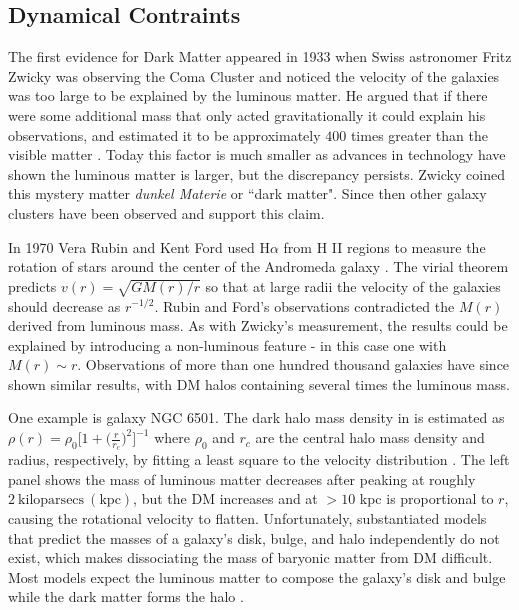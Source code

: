 \subsection{Dynamical Contraints} \label{subsec:dynamics}
The first evidence for Dark Matter appeared in 1933 when Swiss astronomer Fritz Zwicky was observing the Coma Cluster
and noticed the velocity of the galaxies was too large to be explained by the luminous matter.  He argued that if there were
some additional mass that only acted gravitationally it could explain his observations, and estimated it
to be approximately $400$ times greater than the visible matter .  Today this factor is much
smaller as advances in technology have shown the luminous matter is larger, but the discrepancy persists.  Zwicky coined this mystery
matter \textit{dunkel Materie} or ``dark matter".  Since then other galaxy clusters have been observed and support this claim.

In 1970 Vera Rubin and Kent Ford used H$\alpha$ from H II regions to measure the rotation of stars around the
center of the Andromeda galaxy .  The virial theorem predicts $v(r) = \sqrt{GM(r)/r}$ so
that at large radii the velocity of the galaxies should decrease as $r^{-1/2}$.  Rubin and Ford's observations
contradicted the $M(r)$ derived from luminous mass.  As with Zwicky's measurement, the results could be
explained by introducing a non-luminous feature - in this case one with $M(r) \sim r$.  Observations of more than
one hundred thousand galaxies have since shown similar results, with DM halos containing several times the
luminous mass.

One example is galaxy NGC 6501.  The dark halo mass density in  is estimated as
$\rho (r) = \rho_{0} \Big[ 1 + \Big( \frac{r}{r_{c}} \Big)^{2} \Big]^{-1}$ where $\rho_{0}$ and $r_{c}$
are the central halo mass density and radius, respectively, by fitting a least square to the velocity
distribution .  The left panel shows the mass of luminous matter decreases after
peaking at roughly $2\ \mathrm{kiloparsecs\ (kpc)}$, but the DM increases and at $>10$ kpc is proportional to $r$, causing
the rotational velocity to flatten.  Unfortunately, substantiated models that predict the
masses of a galaxy's disk, bulge, and halo independently do not exist, which makes dissociating the mass of baryonic matter from
DM difficult.  Most models expect the luminous matter to compose the galaxy's disk and bulge while the dark matter forms
the halo .



